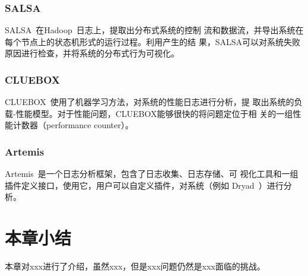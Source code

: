 \subsubsection*{SALSA}

SALSA~\cite{salsa}在Hadoop~\cite{hadoop}日志上，提取出分布式系统的控制
流和数据流，并导出系统在每个节点上的状态机形式的运行过程。利用产生的结
果，SALSA可以对系统失败原因进行检查，并将系统的分布式行为可视化。

\subsubsection*{CLUEBOX}

CLUEBOX~\cite{cluebox}使用了机器学习方法，对系统的性能日志进行分析，提
取出系统的负载-性能模型。对于性能问题，CLUEBOX能够很快的将问题定位于相
关的一组性能计数器（performance counter）。

\subsubsection*{Artemis}

Artemis~\cite{artemis}是一个日志分析框架，包含了日志收集、日志存储、可
视化工具和一组插件定义接口，使用它，用户可以自定义插件，对系统（例如
Dryad~\cite{dryad}）进行分析。

\section{本章小结}

本章对xxx进行了介绍，虽然xxx，但是xxx问题仍然是xxx面临的挑战。
